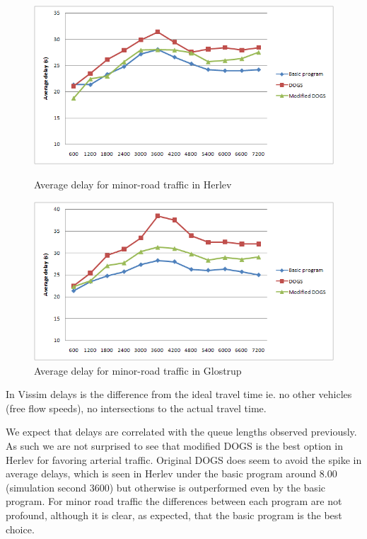\begin{figure}[ht]
\begin{minipage}[b]{0.5\linewidth}
\begin{center}
\includegraphics[scale=0.25]{delay_minor-road_herlev.PNG} 
\end{center}
\caption{Average delay for minor-road traffic in Herlev}
\label{fig:delay_minor-road_herlev}

    \end{minipage}
    \hspace{0.5cm}
    \begin{minipage}[b]{0.5\linewidth}

\begin{center}
\includegraphics[scale=0.25]{delay_minor-road_glostrup.PNG} 
\end{center}
\caption{Average delay for minor-road traffic in Glostrup}
\label{fig:delay_minor-road_glostrup}

    \end{minipage}

\end{figure}

In Vissim delays is the difference from the ideal travel time ie. no other vehicles (free flow speeds), no intersections to the actual travel time. 

We expect that delays are correlated with the queue lengths observed previously. As such we are not surprised to see that modified DOGS is the best option in Herlev for favoring arterial traffic. Original DOGS does seem to avoid the spike in average delays, which is seen in Herlev under the basic program around 8.00 (simulation second 3600) but otherwise is outperformed even by the basic program. 
For minor road traffic the differences between each program are not profound, although it is clear, as expected, that the basic program is the best choice.

